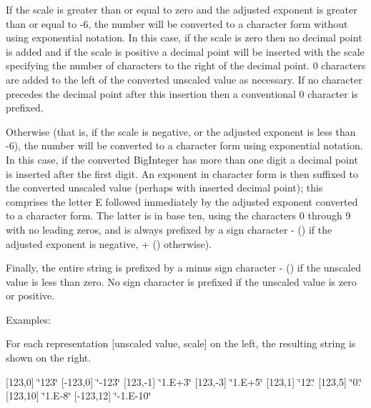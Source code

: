 If the scale is greater than or equal to zero and the adjusted exponent is greater than or equal to -\/6, the number will be converted to a character form without using exponential notation. In this case, if the scale is zero then no decimal point is added and if the scale is positive a decimal point will be inserted with the scale specifying the number of characters to the right of the decimal point. \textquotesingle{}0\textquotesingle{} characters are added to the left of the converted unscaled value as necessary. If no character precedes the decimal point after this insertion then a conventional \textquotesingle{}0\textquotesingle{} character is prefixed. 

Otherwise (that is, if the scale is negative, or the adjusted exponent is less than -\/6), the number will be converted to a character form using exponential notation. In this case, if the converted Big\+Integer has more than one digit a decimal point is inserted after the first digit. An exponent in character form is then suffixed to the converted unscaled value (perhaps with inserted decimal point); this comprises the letter \textquotesingle{}E\textquotesingle{} followed immediately by the adjusted exponent converted to a character form. The latter is in base ten, using the characters \textquotesingle{}0\textquotesingle{} through \textquotesingle{}9\textquotesingle{} with no leading zeros, and is always prefixed by a sign character \textquotesingle{}-\/\textquotesingle{} (\textquotesingle{}\textquotesingle{}) if the adjusted exponent is negative, \textquotesingle{}+\textquotesingle{} (\textquotesingle{}\textquotesingle{}) otherwise). 

Finally, the entire string is prefixed by a minus sign character \textquotesingle{}-\/\textquotesingle{} (\textquotesingle{}\textquotesingle{}) if the unscaled value is less than zero. No sign character is prefixed if the unscaled value is zero or positive. 

Examples\+: 

For each representation \mbox{[}unscaled value, scale\mbox{]} on the left, the resulting string is shown on the right. 

\mbox{[}123,0\mbox{]} \char`\"{}123\char`\"{} \mbox{[}-\/123,0\mbox{]} \char`\"{}-\/123\char`\"{} \mbox{[}123,-\/1\mbox{]} \char`\"{}1.\+E+3\char`\"{} \mbox{[}123,-\/3\mbox{]} \char`\"{}1.\+E+5\char`\"{} \mbox{[}123,1\mbox{]} \char`\"{}12.\char`\"{} \mbox{[}123,5\mbox{]} \char`\"{}0.\char`\"{} \mbox{[}123,10\mbox{]} \char`\"{}1.\+E-\/8\char`\"{} \mbox{[}-\/123,12\mbox{]} \char`\"{}-\/1.\+E-\/10\char`\"{} 

